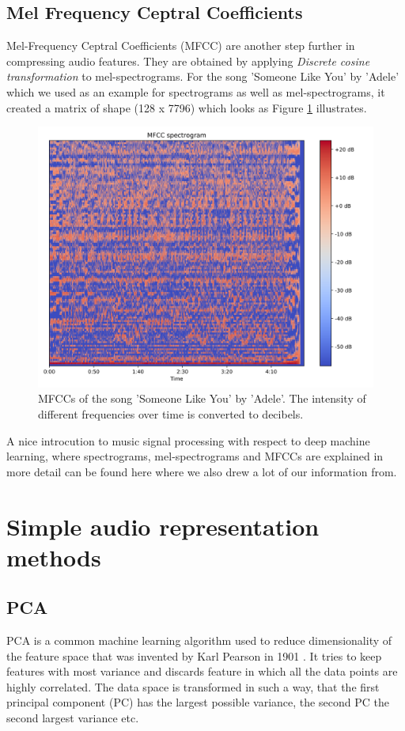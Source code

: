 \subsection{Mel Frequency Ceptral Coefficients}\label{ssec:mfcc_intro}
Mel-Frequency Ceptral Coefficients (MFCC) are another step further in compressing audio features. They are obtained by applying \textit{Discrete cosine transformation} to mel-spectrograms. For the song 'Someone Like You' by 'Adele' which we used as an example for spectrograms as well as mel-spectrograms, it created a matrix of shape (128 x 7796) which looks as Figure \ref{fig:ilustrative_mfccs} illustrates. 

\begin{figure}[h!]
    \centering
	\includegraphics[width=140mm]{./img/mfccs.png}
	\caption{MFCCs of the song 'Someone Like You' by 'Adele'. The intensity of different frequencies over time is converted to decibels.}
	\label{fig:ilustrative_mfccs}
\end{figure}

A nice introcution to music signal processing with respect to deep machine learning, where spectrograms, mel-spectrograms and MFCCs are explained in more detail can be found here \cite{Schluter2017} where we also drew a lot of our information from.

\section{Simple audio representation methods}\label{sec:audio_machine_learning}

\subsection{PCA}
PCA is a common machine learning algorithm used to reduce dimensionality of the feature space that was invented by Karl Pearson in 1901 \cite{doi:10.1080/14786440109462720}. It tries to keep features with most variance and discards feature in which all the data points are highly correlated. The data space is transformed in such a way, that the first principal component (PC) has the largest possible variance, the second PC the second largest variance etc. 

